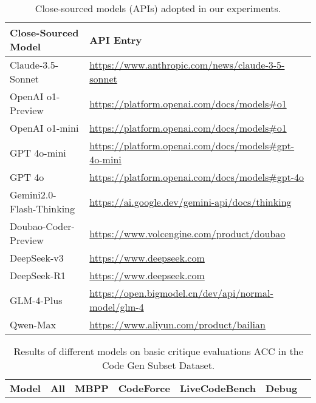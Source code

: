 \documentclass[11pt, a4paper, logo, copyright, nonumbering, amsart]{map}
\begin{document}
\begin{CJK*}{UTF8}{gbsn}
\begin{table*}[h!]
    \small \centering
    \caption{Close-sourced models (APIs) adopted in our experiments.} \label{table:api_model} 
    \begin{adjustbox}{width=0.8\textwidth}
    \begin{tabular}{l|l}
        \toprule
        \textbf{Close-Sourced Model} & \textbf{API Entry} \\
        \midrule
        Claude-3.5-Sonnet & \url{https://www.anthropic.com/news/claude-3-5-sonnet} \\
        OpenAI o1-Preview & \url{https://platform.openai.com/docs/models\#o1} \\
        OpenAI o1-mini & \url{https://platform.openai.com/docs/models\#o1} \\
        GPT 4o-mini & \url{https://platform.openai.com/docs/models#gpt-4o-mini} \\
        GPT 4o & 
        \url{https://platform.openai.com/docs/models\#gpt-4o} \\
        Gemini2.0-Flash-Thinking & \url{https://ai.google.dev/gemini-api/docs/thinking} \\
        Doubao-Coder-Preview & \url{https://www.volcengine.com/product/doubao} \\
        DeepSeek-v3 & \url{https://www.deepseek.com} \\
        DeepSeek-R1 & \url{https://www.deepseek.com} \\
        GLM-4-Plus & \url{https://open.bigmodel.cn/dev/api/normal-model/glm-4} \\
        Qwen-Max & \url{https://www.aliyun.com/product/bailian}\\
        \bottomrule
    \end{tabular}
    \end{adjustbox}
\end{table*}

\begin{table*}[h!]
    \centering
    \caption{Results of different models on basic critique evaluations ACC in the Code Gen Subset Dataset.} \label{table:algo_level1}
    \begin{adjustbox}{width=0.8\textwidth}
    \begin{tabular}{c|cccccc}
    
    \toprule
    \textbf{Model} & \textbf{All} & \textbf{MBPP} & \textbf{CodeForce} & \textbf{LiveCodeBench} & \textbf{Debug} & \\


\end{tabular}
\end{adjustbox}
\end{table*}
\end{CJK*}
\end{document}
